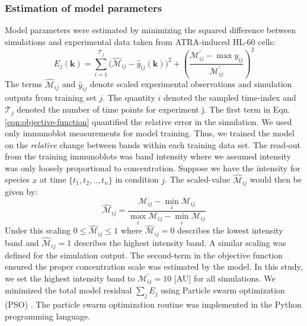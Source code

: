\documentclass[10pt,twocolumn,twoside,final]{IEEEtran}
\begin{document}
\noindent\subsubsection*{Estimation of model parameters}
Model parameters were estimated by minimizing the squared difference between simulations and experimental data taken from ATRA-induced HL-60 cells:
\begin{equation}\label{eqn:objective-function}
	E_{j}(\mathbf{k}) = \sum_{i=1}^{\mathcal{T}_{j}}\biggl(\hat{\mathcal{M}}_{ij}-\hat{y}_{ij}(\mathbf{k})\biggr)^2 + \left(\frac{{\mathcal{M}^{\prime}_{ij}}-\max{y_{ij}}}{{\mathcal{M}^{\prime}_{ij}}}\right)^{2}
\end{equation}
The terms $\hat{\mathcal{M}}_{ij}$ and $\hat{y}_{ij}$ denote scaled experimental observations and simulation outputs from training set $j$.
The quantity $i$ denoted the sampled time-index and $\mathcal{T}_{j}$ denoted the number of time points for experiment j.
The first term in Eqn. \eqref{eqn:objective-function} quantified the relative error in the simulation.
We used only immunoblot measurements for model training.
Thus, we trained the model on the \emph{relative} change between bands within each training data set.
The read-out from the training immunoblots was band intensity where we assumed intensity was only loosely proportional to concentration.
Suppose we have the intensity for species $x$ at time $\{t_{1},t_{2},..,t_{n}\}$ in condition $j$. The scaled-value $\hat{\mathcal{M}}_{ij}$ would then be given by:
\begin{equation}\label{norm_exp_data}
\hat{\mathcal{M}}_{ij} = \frac{\mathcal{M}_{ij} - \min_{i}\mathcal{M}_{ij}}{\max_{i}{\mathcal{M}_{ij}}-\min_{i}{\mathcal{M}_{ij}}}
\end{equation}
Under this scaling $0\leq\hat{\mathcal{M}}_{ij}\leq{1}$ where $\hat{\mathcal{M}}_{ij}=0$ describes the lowest intensity band and $\hat{\mathcal{M}}_{ij}=1$ describes the highest intensity band.
A similar scaling was defined for the simulation output. The second-term in the objective function ensured the proper concentration scale was estimated by the model.
In this study, we set the highest intensity band to $\mathcal{M}^{\prime}_{ij} = 10$ [AU] for all simulations.
We minimized the total model residual $\sum_{j}E_{j}$ using Particle swarm optimization (PSO) \cite{PSO}.
The particle swarm optimization routine was implemented in the Python programming language.


\end{document}
